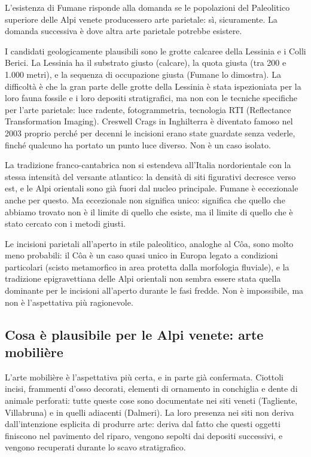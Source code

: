 L'esistenza di Fumane risponde alla domanda se le popolazioni del Paleolitico superiore delle Alpi venete producessero arte parietale: sì, sicuramente. La domanda successiva è dove altra arte parietale potrebbe esistere.

I candidati geologicamente plausibili sono le grotte calcaree della Lessinia e i Colli Berici. La Lessinia ha il substrato giusto (calcare), la quota giusta (tra 200 e 1.000 metri), e la sequenza di occupazione giusta (Fumane lo dimostra). La difficoltà è che la gran parte delle grotte della Lessinia è stata ispezioniata per la loro fauna fossile e i loro depositi stratigrafici, ma non con le tecniche specifiche per l'arte parietale: luce radente, fotogrammetria, tecnologia RTI (Reflectance Transformation Imaging). Creswell Crags in Inghilterra è diventato famoso nel 2003 proprio perché per decenni le incisioni erano state guardate senza vederle, finché qualcuno ha portato un punto luce diverso. Non è un caso isolato.

La tradizione franco-cantabrica non si estendeva all'Italia nordorientale con la stessa intensità del versante atlantico: la densità di siti figurativi decresce verso est, e le Alpi orientali sono già fuori dal nucleo principale. Fumane è eccezionale anche per questo. Ma eccezionale non significa unico: significa che quello che abbiamo trovato non è il limite di quello che esiste, ma il limite di quello che è stato cercato con i metodi giusti.

Le incisioni parietali all'aperto in stile paleolitico, analoghe al Côa, sono molto meno probabili: il Côa è un caso quasi unico in Europa legato a condizioni particolari (scisto metamorfico in area protetta dalla morfologia fluviale), e la tradizione epigravettiana delle Alpi orientali non sembra essere stata quella dominante per le incisioni all'aperto durante le fasi fredde. Non è impossibile, ma non è l'aspettativa più ragionevole.

\subsection{Cosa è plausibile per le Alpi venete: arte mobilière}

L'arte mobilière è l'aspettativa più certa, e in parte già confermata. Ciottoli incisi, frammenti d'osso decorati, elementi di ornamento in conchiglia e dente di animale perforati: tutte queste cose sono documentate nei siti veneti (Tagliente, Villabruna) e in quelli adiacenti (Dalmeri). La loro presenza nei siti non deriva dall'intenzione esplicita di produrre arte: deriva dal fatto che questi oggetti finiscono nel pavimento del riparo, vengono sepolti dai depositi successivi, e vengono recuperati durante lo scavo stratigrafico.

